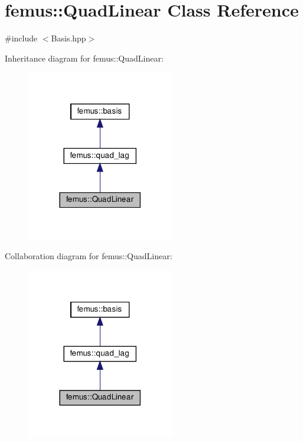 \hypertarget{classfemus_1_1_quad_linear}{}\section{femus\+:\+:Quad\+Linear Class Reference}
\label{classfemus_1_1_quad_linear}


{\ttfamily \#include $<$Basis.\+hpp$>$}



Inheritance diagram for femus\+:\+:Quad\+Linear\+:
\nopagebreak
\begin{figure}[H]
\begin{center}
\leavevmode
\includegraphics[width=182pt]{classfemus_1_1_quad_linear__inherit__graph}
\end{center}
\end{figure}


Collaboration diagram for femus\+:\+:Quad\+Linear\+:
\nopagebreak
\begin{figure}[H]
\begin{center}
\leavevmode
\includegraphics[width=182pt]{classfemus_1_1_quad_linear__coll__graph}
\end{center}
\end{figure}
